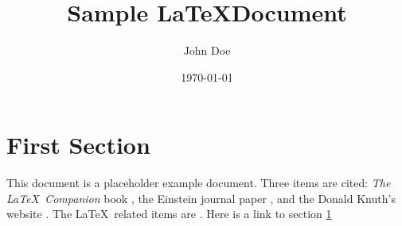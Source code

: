 \documentclass[letterpaper,10pt]{article}
\title{Sample \LaTeX Document}
\author{John Doe}
\date\today
\begin{document}
\maketitle

\tableofcontents

\section{First Section}
\label{sec:one}

This document is a placeholder example document. Three items are cited: \textit{The \LaTeX\ Companion} book \cite{latexcompanion}, the Einstein journal paper \cite{einstein}, and the Donald Knuth's website \cite{knuthwebsite}. The \LaTeX\ related items are \cite{latexcompanion,knuthwebsite}. Here is a link to section \hyperref[sec:one]{1}

\medskip


\end{document}
